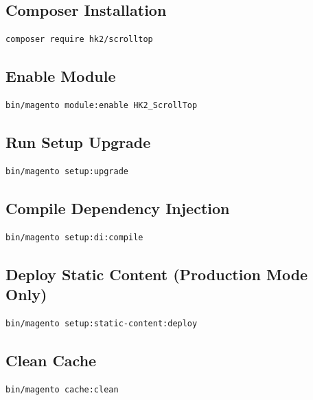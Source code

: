 \documentclass[11pt,a4paper]{article}
\begin{document}
\subsection{Composer Installation}

\begin{lstlisting}[style=shell]
composer require hk2/scrolltop
\end{lstlisting}

\subsection{Enable Module}

\begin{lstlisting}[style=shell]
bin/magento module:enable HK2_ScrollTop
\end{lstlisting}

\subsection{Run Setup Upgrade}

\begin{lstlisting}[style=shell]
bin/magento setup:upgrade
\end{lstlisting}

\subsection{Compile Dependency Injection}

\begin{lstlisting}[style=shell]
bin/magento setup:di:compile
\end{lstlisting}

\subsection{Deploy Static Content (Production Mode Only)}

\begin{lstlisting}[style=shell]
bin/magento setup:static-content:deploy
\end{lstlisting}

\subsection{Clean Cache}

\begin{lstlisting}[style=shell]
bin/magento cache:clean
\end{lstlisting}
\end{document}
